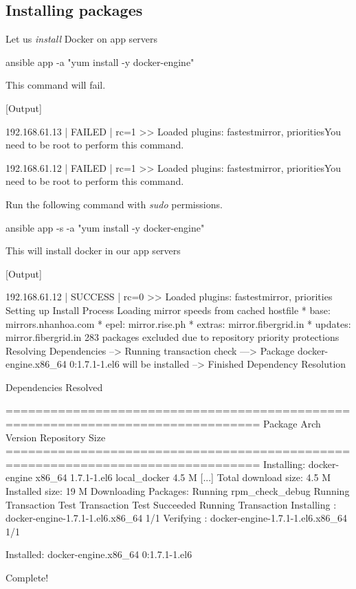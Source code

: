 \subsection{Installing packages}

Let us \emph{install} Docker on app servers

\begin{code}
ansible app -a "yum install -y docker-engine"
\end{code}

This command will fail.

[Output]\newline
\begin{code}
192.168.61.13 | FAILED | rc=1 >>
Loaded plugins: fastestmirror, prioritiesYou need to be root to perform this command.

192.168.61.12 | FAILED | rc=1 >>
Loaded plugins: fastestmirror, prioritiesYou need to be root to perform this command.
\end{code}

Run the following command with \emph{sudo} permissions.

\begin{code}
ansible app -s -a "yum install -y docker-engine"
\end{code}

This will install docker in our app servers

[Output]\newline
\begin{code}
192.168.61.12 | SUCCESS | rc=0 >>
Loaded plugins: fastestmirror, priorities
Setting up Install Process
Loading mirror speeds from cached hostfile
 * base: mirrors.nhanhoa.com
 * epel: mirror.rise.ph
 * extras: mirror.fibergrid.in
 * updates: mirror.fibergrid.in
283 packages excluded due to repository priority protections
Resolving Dependencies
--> Running transaction check
---> Package docker-engine.x86_64 0:1.7.1-1.el6 will be installed
--> Finished Dependency Resolution

Dependencies Resolved

================================================================================
 Package             Arch         Version              Repository          Size
================================================================================
Installing:
 docker-engine       x86_64       1.7.1-1.el6          local_docker       4.5 M
                              [...]
Total download size: 4.5 M
Installed size: 19 M
Downloading Packages:
Running rpm_check_debug
Running Transaction Test
Transaction Test Succeeded
Running Transaction
  Installing : docker-engine-1.7.1-1.el6.x86_64                             1/1
  Verifying  : docker-engine-1.7.1-1.el6.x86_64                             1/1

Installed:
  docker-engine.x86_64 0:1.7.1-1.el6

Complete!
\end{code}

